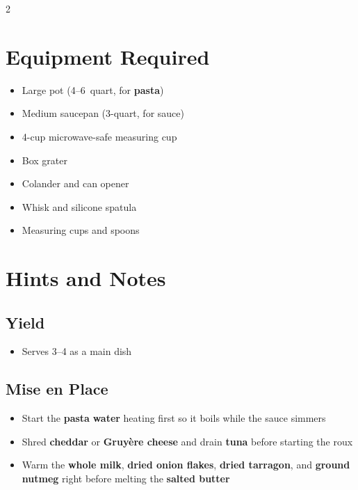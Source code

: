 \documentclass[11pt,letterpaper]{article}
\begin{document}
{\footnotesize
\setlength{\columnsep}{20pt}
\setlength{\multicolsep}{6pt}
\begin{multicols}{2}
\setlength{\parindent}{0pt}
\setlength{\parskip}{2pt}
\setlength{\itemsep}{0pt}
\setlength{\parsep}{0pt}

\section*{Equipment Required}
\begin{itemize}
    \item Large pot (4--6~quart, for \textbf{pasta})
    \item Medium saucepan (3-quart, for sauce)
    \item 4-cup microwave-safe measuring cup
    \item Box grater
    \item Colander and can opener
    \item Whisk and silicone spatula
    \item Measuring cups and spoons
\end{itemize}

\section*{Hints and Notes}
\subsection*{Yield}
\begin{itemize}
    \item Serves 3--4 as a main dish
\end{itemize}

\subsection*{Mise en Place}
\begin{itemize}
    \item Start the \textbf{pasta} \textbf{water} heating first so it boils while the sauce simmers
    \item Shred \textbf{cheddar} or \textbf{Gruyère cheese} and drain \textbf{tuna} before starting the roux
    \item Warm the \textbf{whole milk}, \textbf{dried onion flakes}, \textbf{dried tarragon}, and \textbf{ground nutmeg} right before melting the \textbf{salted butter}
\end{itemize}


\end{multicols}}
\end{document}
